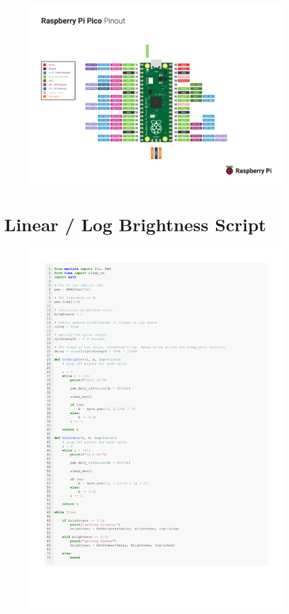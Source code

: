 \documentclass[%
 reprint,
 amsmath,amssymb,
 aps,
]{revtex4-2}
\begin{document}
    \begin{figure}[h]
        \includegraphics[width=\columnwidth]{Images/Pico-R3-A4-Pinout.pdf}
    \end{figure}

\section{Linear / Log Brightness Script}
    \begin{figure}[h]
        \includegraphics[width=\columnwidth]{Images/linearLogBrightness.pdf}
    \end{figure}
\end{document}
